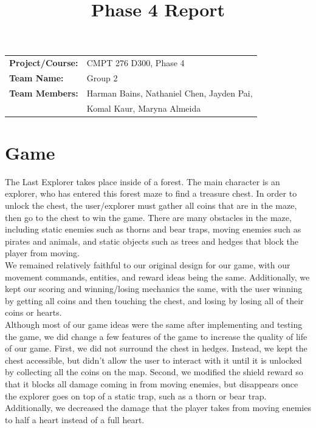 \documentclass[12pt,letterpaper]{article}
\title{Phase 4 Report}
\author{}
\begin{document}
\maketitle

\begin{tabular}{ll}
\textbf{Project/Course:} & CMPT 276 D300, Phase 4 \\
\textbf{Team Name:}      & Group 2 \\
\textbf{Team Members:}   & Harman Bains, Nathaniel Chen, Jayden Pai, \\
                         & Komal Kaur, Maryna Almeida
\end{tabular}


\section{Game}
The Last Explorer takes place inside of a forest. The main character is an explorer, who has entered this forest maze to find a treasure chest. In order to unlock the chest, the user/explorer must gather all coins that are in the maze, then go to the chest to win the game. There are many obstacles in the maze, including static enemies such as thorns and bear traps, moving enemies such as pirates and animals, and static objects such as trees and hedges that block the player from moving. \\

We remained relatively faithful to our original design for our game, with our movement commands, entities, and reward ideas being the same. Additionally, we kept our scoring and winning/losing mechanics the same, with the user winning by getting all coins and then touching the chest, and losing by losing all of their coins or hearts. \\

Although most of our game ideas were the same after implementing and testing the game, we did change a few features of the game to increase the quality of life of our game. First, we did not surround the chest in hedges. Instead, we kept the chest accessible, but didn't allow the user to interact with it until it is unlocked by collecting all the coins on the map. Second, we modified the shield reward so that it blocks all damage coming in from moving enemies, but disappears once the explorer goes on top of a static trap, such as a thorn or bear trap. Additionally, we decreased the damage that the player takes from moving enemies to half a heart instead of a full heart. \\
\end{document}
